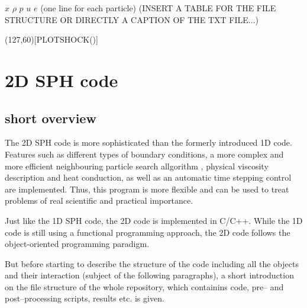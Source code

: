 \documentclass{report}
\begin{document}
$x$ $\rho$ $p$ $u$ $e$
(one line for each particle)
(INSERT A TABLE FOR THE FILE STRUCTURE OR DIRECTLY A CAPTION OF THE TXT FILE...)
\vspace{5mm}
\sProofOn
\begin{struktogramm}(127,60)[PLOTSHOCK()]
  \whileend
\end{struktogramm}
\sProofOff


\section{2D SPH code}
\label{sec:2DSPHcode}
\subsection{short overview}
\label{sec:shortOverview2D}
The 2D SPH code is more sophisticated than the formerly introduced 1D code. Features such as different types of boundary conditions, a more complex and more efficient neighbouring particle search allgorithm , physical viscosity description and heat conduction, as well as an automatic time stepping control are implemented. Thus, this program is more flexible and can be used to treat problems of real scientific and practical importance. 

Just like the 1D SPH code, the 2D code is implemented in C/C++. While the 1D code is still using a functional programming approach, the 2D code follows the object-oriented programming paradigm.

But before starting to describe the structure of the code including all the objects and their interaction (subject of the following paragraphs), a short introduction on the file structure of the whole repository, which containins code, pre-- and post--processing scripts, results etc. is given.
\end{document}
